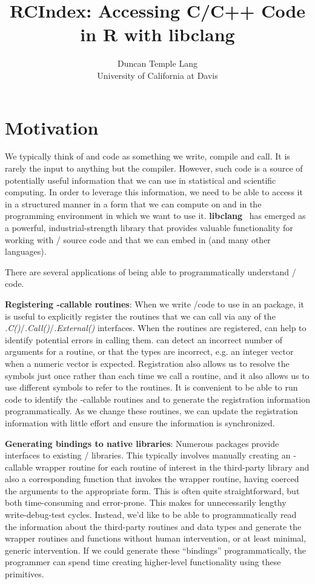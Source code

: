 \documentclass[article]{jss}
\author{Duncan Temple Lang\\University of California at Davis}
\title{RCIndex: Accessing C/C++ Code in R with libclang}
\def\C{\proglang{C}}
\def\Cpp{\proglang{C$++$}}
\def\R{\proglang{R}}
\def\Rfunc#1{\textsl{#1()}}
\def\libclang{\textbf{libclang}}
\begin{document}
\section{Motivation}\label{sec:Introduction}

We typically think of \C{} and \Cpp{} code as something we write,
compile and call. It is rarely the input to anything but the compiler.
However, such code is a source of potentially useful information that
we can use in statistical and scientific computing.  In order to
leverage this information, we need to be able to access it in a
structured manner in a form that we can compute on and in the
programming environment in which we want to use it.
\libclang{}~\cite{bib:libclang,bib:libclangSlides} has
emerged as a powerful, industrial-strength library that provides
valuable functionality for working with \C/\Cpp{} source code and that
we can embed in \R (and many other languages).

There are several applications of being able to programmatically
understand \C/\Cpp{} code.

\textbf{Registering \R-callable routines}: When we write \C/\Cpp code
to use in an \R{} package, it is useful to explicitly register the
routines that we can call via any of the
\Rfunc{.C}/\Rfunc{.Call}/\Rfunc{.External} interfaces.  When the
routines are registered, \R{} can help to identify potential errors in
calling them.  \R{} can detect an incorrect number of arguments for a
routine, or that the types are incorrect, e.g. an integer vector when
a numeric vector is expected. Registration also allows us to resolve
the symbols just once rather than each time we call a routine, and it
also allows us to use different symbols to refer to the routines.  It
is convenient to be able to run \R{} code to identify the \R-callable
routines and to generate the registration information
programmatically.  As we change these routines, we can update the
registration information with little effort and ensure the information
is synchronized.


\textbf{Generating bindings to native libraries}: Numerous \R{}
packages provide interfaces to existing \C/\Cpp{} libraries.  This
typically involves manually creating an \R-callable wrapper routine
for each routine of interest in the third-party library and also a
corresponding \R{} function that invokes the wrapper routine, having
coerced the \R{} arguments to the appropriate form.  This is often
quite straightforward, but both time-consuming and error-prone.  This
makes for unnecessarily lengthy write-debug-test cycles.  Instead,
we'd like to be able to programmatically read the information about
the third-party routines and data types and generate the wrapper
routines and \R{} functions without human intervention, or at least
minimal, generic intervention.  If we could generate these
``bindings'' programmatically, the \R{} programmer can spend time
creating higher-level functionality using these primitives.
\end{document}

